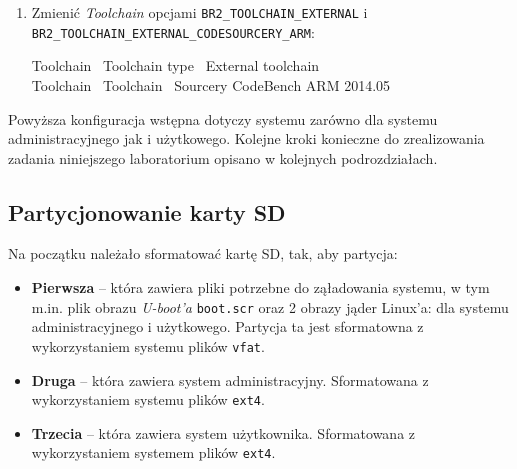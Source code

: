 \documentclass{article}
\newenvironment{ttblock}{\ttfamily}{\par}
\begin{document}
\begin{enumerate}
\item Zmienić \emph{Toolchain} opcjami \texttt{BR2\_TOOLCHAIN\_EXTERNAL} i\\ \texttt{BR2\_TOOLCHAIN\_EXTERNAL\_CODESOURCERY\_ARM}:

\begin{ttblock}
Toolchain \textrightarrow\ Toolchain type \textrightarrow\ External toolchain\\
Toolchain \textrightarrow\ Toolchain \textrightarrow\ Sourcery CodeBench ARM 2014.05
\end{ttblock}

%
\end{enumerate}

Powyższa konfiguracja wstępna dotyczy systemu zarówno dla systemu administracyjnego jak i użytkowego. Kolejne kroki konieczne do zrealizowania zadania niniejszego laboratorium opisano w kolejnych podrozdziałach.


\subsection{Partycjonowanie karty SD}
\label{partitions}

Na początku należało sformatować kartę SD, tak, aby partycja:
\begin{itemize}
	\item \textbf{Pierwsza} -- która zawiera pliki potrzebne do ząładowania systemu, w tym m.in. plik obrazu \emph{U-boot'a} \texttt{boot.scr} oraz 2 obrazy jąder Linux'a: dla systemu administracyjnego i użytkowego. Partycja ta jest sformatowna z wykorzystaniem systemu plików \texttt{vfat}.
	\item \textbf{Druga} -- która zawiera system administracyjny. Sformatowana z wykorzystaniem systemu plików \texttt{ext4}.
	\item \textbf{Trzecia} -- która zawiera system użytkownika. Sformatowana z wykorzystaniem systemem plików \texttt{ext4}.
\end{itemize}
\end{document}
